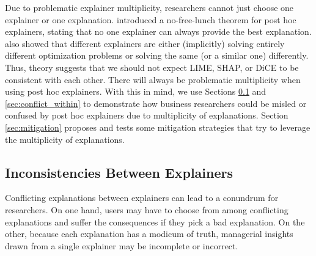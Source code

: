 \documentclass[11pt]{article}    %
\begin{document}
        Due to problematic explainer multiplicity, researchers cannot just choose one explainer or one explanation. \cite{han22which} introduced a no-free-lunch theorem for post hoc explainers, stating that no one explainer can always provide the best explanation. %
        \cite{kommiya21towards} also showed that different explainers are either (implicitly) solving entirely different optimization problems or solving the same (or a similar one) differently. %
        Thus, theory suggests that we should not expect LIME, SHAP, or DiCE to be consistent with each other. There will always be problematic multiplicity when using post hoc explainers. With this in mind, we use Sections \ref{sec:conflict_between} and \ref{sec:conflict_within} to demonstrate how business researchers could be misled or confused by post hoc explainers due to multiplicity of explanations. Section \ref{sec:mitigation} proposes and tests some mitigation strategies that try to leverage the multiplicity of explanations. 

       \subsection{Inconsistencies Between Explainers}
        \label{sec:conflict_between}
            Conflicting explanations between explainers can lead to a conundrum for researchers. On one hand, users may have to choose from among conflicting explanations and suffer the consequences if they pick a bad explanation. On the other, because each explanation has a modicum of truth, managerial insights drawn from a single explainer may be incomplete or incorrect. %
    
\end{document}
